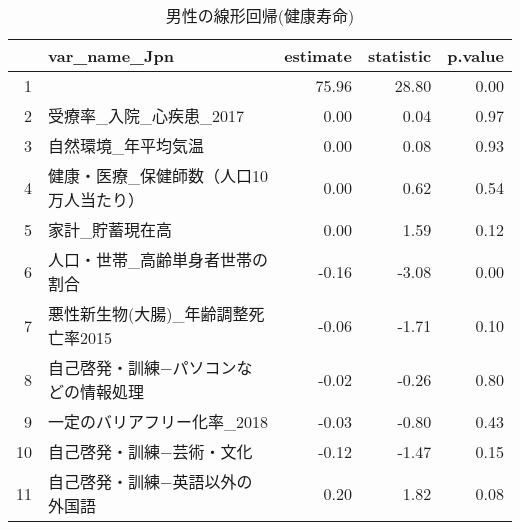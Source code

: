 \begin{table}[ht]
\centering
\begingroup\tiny
\begin{tabular}{rlrrr}
  \hline
 & var\_name\_Jpn & estimate & statistic & p.value \\ 
  \hline
1 &  & 75.96 & 28.80 & 0.00 \\ 
  2 & 受療率\_入院\_心疾患\_2017 & 0.00 & 0.04 & 0.97 \\ 
  3 & 自然環境\_年平均気温 & 0.00 & 0.08 & 0.93 \\ 
  4 & 健康・医療\_保健師数（人口10万人当たり） & 0.00 & 0.62 & 0.54 \\ 
  5 & 家計\_貯蓄現在高 & 0.00 & 1.59 & 0.12 \\ 
  6 & 人口・世帯\_高齢単身者世帯の割合 & -0.16 & -3.08 & 0.00 \\ 
  7 & 悪性新生物(大腸)\_年齢調整死亡率2015 & -0.06 & -1.71 & 0.10 \\ 
  8 & 自己啓発・訓練−パソコンなどの情報処理 & -0.02 & -0.26 & 0.80 \\ 
  9 & 一定のバリアフリー化率\_2018 & -0.03 & -0.80 & 0.43 \\ 
  10 & 自己啓発・訓練−芸術・文化 & -0.12 & -1.47 & 0.15 \\ 
  11 & 自己啓発・訓練−英語以外の外国語 & 0.20 & 1.82 & 0.08 \\ 
   \hline
\end{tabular}
\endgroup
\caption{男性の線形回帰(健康寿命)} 
\label{UsualHLMLEf}
\end{table}
